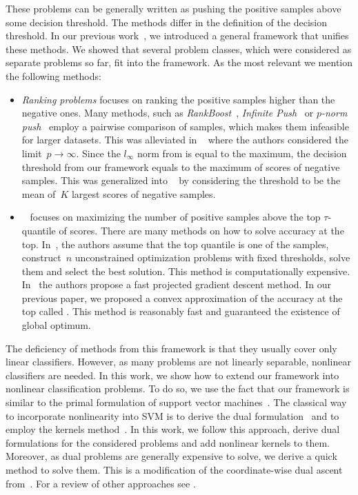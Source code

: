These problems can be generally written as pushing the positive samples above some decision threshold. The methods differ in the definition of the decision threshold. In our previous work~\cite{adam2019patmat}, we introduced a general framework that unifies these methods. We showed that several problem classes, which were considered as separate problems so far, fit into the framework. As the most relevant we mention the following methods:
\begin{itemize}
  \item \emph{Ranking problems} focuses on ranking the positive samples higher than the negative ones. Many methods, such as \emph{RankBoost}~\cite{freund2003efficient}, \emph{Infinite Push}~\cite{agarwal2011infinite} or \emph{$p$-norm push}~\cite{rudin2009pnorm} employ a pairwise comparison of samples, which makes them infeasible for larger datasets. This was alleviated in \TopPush~\cite{li2014top} where the authors considered the limit~$p \rightarrow \infty$. Since the $l_{\infty}$ norm from \TopPush is equal to the maximum, the decision threshold from our framework equals to the maximum of scores of negative samples. This was generalized into \TopPushK~\cite{adam2019patmat} by considering the threshold to be the mean of~$K$ largest scores of negative samples.

  \item \AccatTop~\cite{boyd2012accuracy} focuses on maximizing the number of positive samples above the top $\tau$-quantile of scores. There are many methods on how to solve accuracy at the top. In~\cite{boyd2012accuracy}, the authors assume that the top quantile is one of the samples, construct~$n$ unconstrained optimization problems with fixed thresholds, solve them and select the best solution. This method is computationally expensive. In~\cite{grill2016learning} the authors propose a fast projected gradient descent method. In our previous paper, we proposed a convex approximation of the accuracy at the top called \PatMat. This method is reasonably fast and guaranteed the existence of global optimum.
\end{itemize}

The deficiency of methods from this framework is that they usually cover only linear classifiers. However, as many problems are not linearly separable, nonlinear classifiers are needed. In this work, we show how to extend our framework into nonlinear classification problems. To do so, we use the fact that our framework is similar to the primal formulation of support vector machines~\cite{cortes1995support}. The classical way to incorporate nonlinearity into SVM is to derive the dual formulation~\cite{boyd2004convex} and to employ the kernels method~\cite{scholkopf2001learning}. In this work, we follow this approach, derive dual formulations for the considered problems and add nonlinear kernels to them. Moreover, as dual problems are generally expensive to solve, we derive a quick method to solve them. This is a modification of the coordinate-wise dual ascent from~\cite{hsieh2008dual}. For a review of other approaches see \cite{batmaz2019review,werner2019review}.

